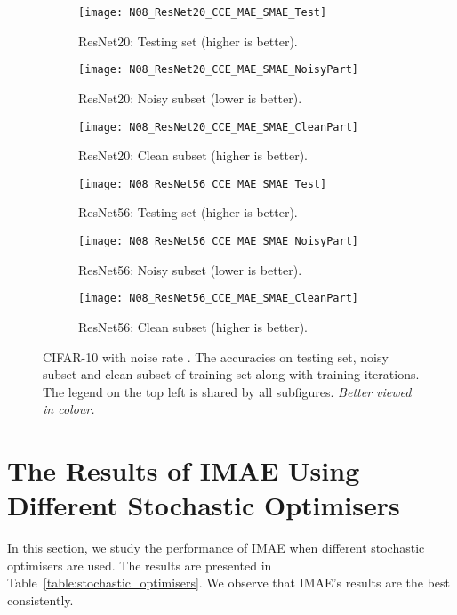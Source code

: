\documentclass{article}
\begin{document}
\begin{table}[!t]
\begin{figure*}[t!]
	\centering
	\begin{subfigure}[t!]{0.33\linewidth}
		\centering
		\texttt{[image: N08\_ResNet20\_CCE\_MAE\_SMAE\_Test]}
		\caption{ResNet20: Testing set (higher is better).}
	\end{subfigure}\begin{subfigure}[t!]{0.33\linewidth}
		\centering
		\texttt{[image: N08\_ResNet20\_CCE\_MAE\_SMAE\_NoisyPart]}
		\caption{ResNet20: Noisy subset  (lower is better).}
	\end{subfigure}
	\begin{subfigure}[t!]{0.33\linewidth}
		\centering
		\texttt{[image: N08\_ResNet20\_CCE\_MAE\_SMAE\_CleanPart]}
		\caption{ResNet20: Clean subset (higher is better).}
	\end{subfigure}
\begin{subfigure}[t!]{0.33\linewidth}
		\centering
		\texttt{[image: N08\_ResNet56\_CCE\_MAE\_SMAE\_Test]}
		\caption{ResNet56: Testing set (higher is better).}
	\end{subfigure}\begin{subfigure}[t!]{0.33\linewidth}
		\centering
		\texttt{[image: N08\_ResNet56\_CCE\_MAE\_SMAE\_NoisyPart]}
		\caption{ResNet56: Noisy subset  (lower is better).}
	\end{subfigure}
	\begin{subfigure}[t!]{0.33\linewidth}
		\centering
		\texttt{[image: N08\_ResNet56\_CCE\_MAE\_SMAE\_CleanPart]}
		\caption{ResNet56: Clean subset (higher is better).}
	\end{subfigure}
\caption{CIFAR-10 with noise rate . The accuracies on testing set, noisy subset and clean subset of training set along with training iterations.
		The legend on the top left is shared by all subfigures. 
		\textit{Better viewed in colour.} }
	\label{fig:ResNet2056_Noise80_CCE_MAE_SMAE_dynamics}
\end{figure*}





\section{The Results of IMAE Using Different Stochastic Optimisers}
In this section, we study the performance of IMAE when different stochastic optimisers are used. The results are presented in Table~\ref{table:stochastic_optimisers}. We observe that IMAE's results are the best consistently. 








\end{table}
\end{document}
